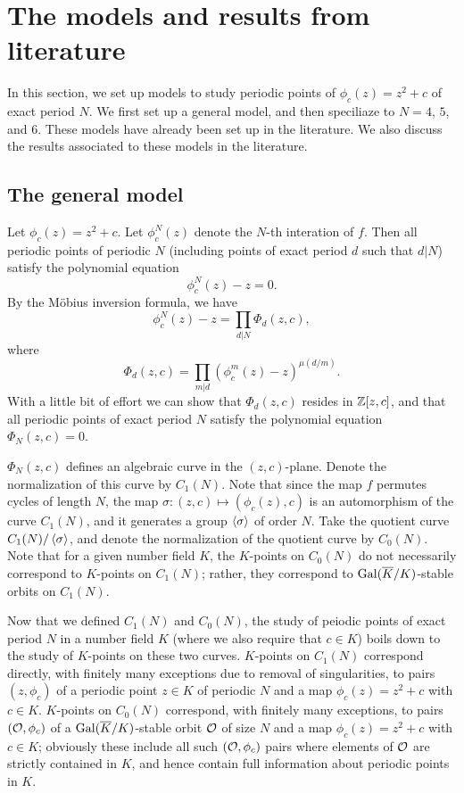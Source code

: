 \section{The models and results from literature}
\label{sec:model}

In this section, we set up models to study periodic points of
$\phi_c(z) = z^2 + c$ of exact period $N$. We first set up a general
model, and then speciliaze to $N = 4$, $5$, and $6$. These models have
already been set up in the literature. We also discuss the results
associated to these models in the literature.

\subsection{The general model}

Let $\phi_c(z) = z^2 + c$. Let $\phi_c^N(z)$ denote the $N$-th
interation of $f$. Then all periodic points of periodic $N$ (including
points of exact period $d$ such that $d | N$) satisfy the polynomial
equation
\[
\phi_c^N(z) - z = 0.
\]
By the M\"obius inversion formula, we have
\[
\phi_c^N(z) - z = \prod_{d|N} \Phi_d(z, c),
\]
where
\[
\Phi_d(z, c) = \prod_{m|d}(\phi_c^m(z) - z)^{\mu(d/m)}.
\]
With a little bit of effort we can show that $\Phi_d(z, c)$ resides in
$\mathbb{Z}[z, c]$, and that all periodic points of exact period $N$ satisfy
the polynomial equation $\Phi_N(z, c) = 0$.

$\Phi_N(z, c)$ defines an algebraic curve in the $(z,
c)$-plane. Denote the normalization of this curve by $C_1(N)$. Note
that since the map $f$ permutes cycles of length $N$, the map $\sigma:
(z, c) \mapsto (\phi_c(z), c)$ is an automorphism of the curve
$C_1(N)$, and it generates a group $\left<\sigma\right>$ of order $N$. Take
the quotient curve $C_1(N)/\left<\sigma\right>$, and denote the normalization
of the quotient curve by $C_0(N)$. Note that for a given number field
$K$, the $K$-points on $C_0(N)$ do not necessarily correspond to
$K$-points on $C_1(N)$; rather, they correspond to
$\mathrm{Gal}(\overline{K}/K)$-stable orbits on $C_1(N)$.

Now that we defined $C_1(N)$ and $C_0(N)$, the study of peiodic points
of exact period $N$ in a number field $K$ (where we also require that
$c \in K$) boils down to the study of $K$-points on these two
curves. $K$-points on $C_1(N)$ correspond directly, with finitely many
exceptions due to removal of singularities, to pairs $(z, \phi_c)$ of
a periodic point $z \in K$ of periodic $N$ and a map $\phi_c(z) = z^2
+ c$ with $c \in K$. $K$-points on $C_0(N)$ correspond, with finitely
many exceptions, to pairs $(\mathcal{O}, \phi_c)$ of a $\mathrm{Gal}(\overline{K}/K)$-stable
orbit $\mathcal{O}$ of size $N$ and a map $\phi_c(z) = z^2 + c$ with $c \in K$;
obviously these include all such $(\mathcal{O}, \phi_c)$ pairs where elements
of $\mathcal{O}$ are strictly contained in $K$, and hence contain full
information about periodic points in $K$.

